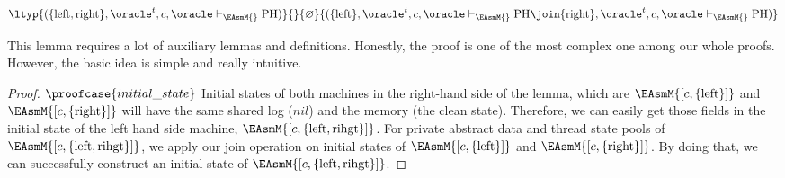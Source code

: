 \begin{lemma}
\begin{small}
$$\ltyp{(\{\mathrm{left}, \mathrm{right}\}, \oracle^t, c, \oracle  \vdash_{\EAsmM{}} \mathrm{PH})}{}{\varnothing}
{(\{\mathrm{left}\}, \oracle^t, c, \oracle \vdash_{\EAsmM{}} \mathrm{PH}
 \join \{\mathrm{right}\}, \oracle^t, c, \oracle  \vdash_{\EAsmM{}} \mathrm{PH})}$$
\end{small}
\label{lemma:thread-single-compose}
\end{lemma}%
This lemma requires a lot of auxiliary lemmas and definitions.
Honestly, the proof is one of the most complex one among our whole proofs.
However, the basic idea is simple and really intuitive.
\begin{proof}
$\proofcase{initial\_state}$ 
Initial states of both machines in the right-hand side of the lemma, 
which are $\EAsmM{[c, \mathrm{\{left\}}]}$ and $\EAsmM{[c, \mathrm{\{right\}}]}$
will have the same shared log ($nil$) and the memory (the clean state). 
Therefore, we can easily  get those fields in the initial state 
of the left hand side machine, $\EAsmM{[c, \mathrm{\{left, rihgt\}}]}$.
For private abstract data and thread state pools of $\EAsmM{[c, \mathrm{\{left, rihgt\}}]}$, 
we apply our join operation on initial states of $\EAsmM{[c, \mathrm{\{left\}}]}$ and $\EAsmM{[c, \mathrm{\{right\}}]}$. 
By doing that, we can successfully construct an initial state of $\EAsmM{[c, \mathrm{\{left, rihgt\}}]}$.


\end{proof}
